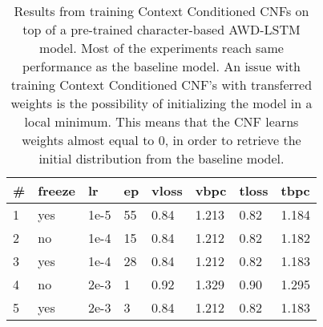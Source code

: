 \begin{table}
\centering
\caption{Results from training Context Conditioned CNFs on top of a pre-trained character-based AWD-LSTM model. Most of the experiments reach same performance as the baseline model. An issue with training Context Conditioned CNF's with transferred weights is the possibility of initializing the model in a local minimum. This means that the CNF learns weights almost equal to 0, in order to retrieve the initial distribution from the baseline model.}

\begin{tabular}{|l|l|l|l|l|l|l|l|}
\hline
\textbf{\#} & \textbf{freeze} & \textbf{lr} & \textbf{ep} & \textbf{vloss} & \textbf{vbpc} & \textbf{tloss} & \textbf{tbpc} \\ \hline
1       & yes             & 1e-5        & 55          & 0.84           & 1.213         & 0.82           & 1.184         \\ \hline
2       & no              & 1e-4        & 15          & 0.84           & 1.212         & 0.82           & 1.182         \\ \hline
3       & yes             & 1e-4        & 28          & 0.84           & 1.212         & 0.82           & 1.183         \\ \hline
4       & no              & 2e-3        & 1           & 0.92           & 1.329         & 0.90           & 1.295         \\ \hline
5       & yes             & 2e-3        & 3           & 0.84           & 1.212         & 0.82           & 1.183         \\ \hline
\end{tabular}
\label{table:experiments:cnfh_characters}
\end{table}
